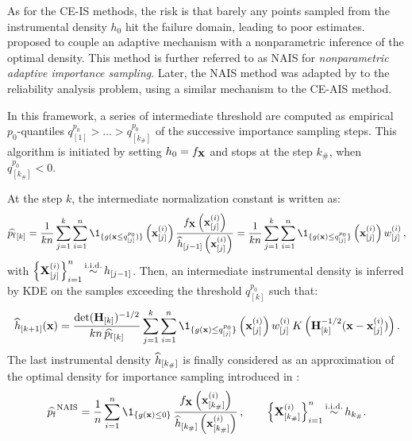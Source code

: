 As for the CE-IS methods, the risk is that barely any points sampled from the instrumental density $h_0$ hit the failure domain, leading to poor estimates. 
\citet{zhang_1996_NIS} proposed to couple an adaptive mechanism with a nonparametric inference of the optimal density. 
This method is further referred to as NAIS for \textit{nonparametric adaptive importance sampling}. 
Later, the NAIS method was adapted by \cite{Morio_RESS_2011} to the reliability analysis problem, using a similar mechanism to the CE-AIS method. 

In this framework, a series of intermediate threshold are computed as empirical $p_0$-quantiles $q_{[1]}^{p_0} > \dots > q_{[k_\#]}^{p_0}$ of the successive importance sampling steps. 
This algorithm is initiated by setting $h_0 = f_{\bf X}$ and stops at the step $k_\#$, when  $q_{[k_\#]}^{p_0} < 0$.

At the step $k$, the intermediate normalization constant is written as: 
\begin{equation}
    \what{\pf}_{[k]} = \frac{1}{k n} \sum_{j=1}^{k} \sum_{i=1}^{n} \1_{\{g(\bx \leq q_{[j]}^{p_0})\}}\left(\bx^{(i)}_{[j]}\right) \frac{f_\bX\left(\bx^{(i)}_{[j]}\right)}{\what{h}_{[j-1]}\left(\bx^{(i)}_{[j]}\right)}
    = \frac{1}{k n} \sum_{j=1}^{k} \sum_{i=1}^{n} \1_{\{g(\bx) \leq q_{[j]}^{p_0}\}}\left(\bx^{(i)}_{[j]}\right) w^{(i)}_{[j]} \, , 
\end{equation}
with $\left\{{\bf X}_{[j]}^{(i)}\right\}_{i=1}^n \mathop{\sim}\limits^{\mathrm{i.i.d.}} h_{[j-1]}$. 
Then, an intermediate instrumental density is inferred by KDE on the samples exceeding the threshold $q_{[k]}^{p_0}$ such that:
\begin{equation}
    \what{h}_{[k+1]}(\bx) = \frac{\mathrm{det}(\bH_{[k]})^{-1/2}}{k n \, \what{\pf}_{[k]}} \sum_{j=1}^{k} \sum_{i=1}^{n} 
            \1_{\{g(\bx) \leq q_{[j]}^{p_0}\}}\left(\bx^{(i)}_{[j]}\right) w^{(i)}_{[j]} \, K\left(\bH_{[k]}^{-1/2} (\bx - \bx^{(i)}_{[j]})\right).
\end{equation} 
The last instrumental density $\widehat{h}_{[k_{\#}]}$ is finally considered as an approximation of the optimal density for importance sampling introduced in : 
\begin{equation}
    \what{\pf}^{\mathrm{NAIS}} = \frac1n \sum_{i=1}^{n} \1_{\{g(\bx) \leq 0\}} \,
                                                 \frac{f_\bX\left(\bx^{(i)}_{[k_{\#}]}\right)}{\what{h}_{[k_{\#}]}\left(\bx^{(i)}_{[k_{\#}]}\right)} \, , \qquad
                                                 \left\{\bX_{[k_{\#}]}^{(i)}\right\}_{i=1}^n \simiid h_{k_{\#}}.
\end{equation}

